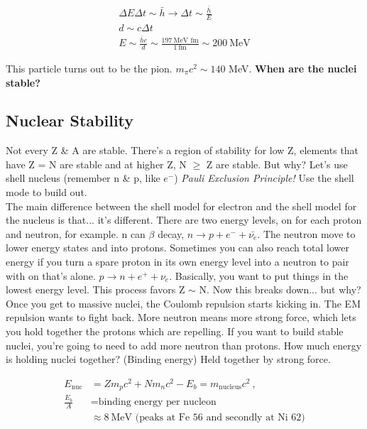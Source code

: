 \documentclass[10pt,a4paper]{article}
\begin{document}
\begin{eqnarray}
\Delta E \Delta t \sim \bar{h} \rightarrow \Delta t \sim \frac{\bar{h}}{E}\\
d \sim c \Delta t\\
E \sim \frac{\bar{h}c}{d} \sim \frac{ 197 ~\text{MeV fm}}{1 ~\text{fm}} \sim 200~ \text{MeV}
\end{eqnarray}

This particle turns out to be the pion. $m_\pi c^2 \sim 140$ MeV. \textbf{When are the nuclei stable? }

\subsection{Nuclear Stability}
Not every Z \& A are stable. There's a region of stability for low Z, elements that have Z = N are stable and at higher Z, N $\geq$ Z are stable. But why? Let's use shell nucleus (remember n \& p, like $e^-$) \textit{Pauli Exclusion Principle!} Use the shell mode to build out. \\

The main difference between the shell model for electron and the shell model for the nucleus is that... it's different. There are two energy levels, on for each proton and neutron, for example. n can $\beta$ decay, $n \rightarrow p + e^- + \bar{\nu_e}$. The neutron move to lower energy states and into protons. Sometimes you can also reach total lower energy if you turn a spare proton in its own energy level into a neutron to pair with on that's alone. $ p \rightarrow n + e^+ + \nu_e$. Basically, you want to put things in the lowest energy level. This process favors Z $\sim$ N. Now this breaks down... but why? \\
Once you get to massive nuclei, the Coulomb repulsion starts kicking in. The EM repulsion wants to fight back. More neutron means more strong force, which lets you hold together the protons which are repelling. If you want to build stable nuclei, you're going to need to add more neutron than protons. How much energy is holding nuclei together? (Binding energy) Held together by strong force. 

\begin{align}
E_\text{nuc} & = Zm_pc^2 + N m_n c^2 -E_b = m_\text{nucleus}c^2~,\\
\frac{E_b}{A} & = \text{binding energy per nucleon}\\
& \approx 8~\text{MeV (peaks at Fe 56 and secondly at Ni 62)}
\end{align}
\end{document}

